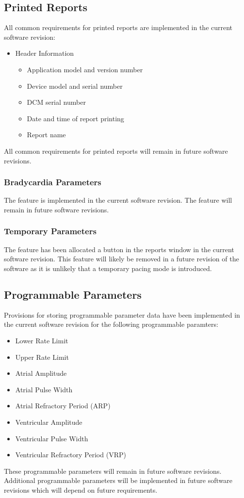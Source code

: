 \documentclass[12pt]{article}
\begin{document}
\subsection{Printed Reports}
All common requirements for printed reports are implemented in the current software revision:
\begin{itemize}
    \item Header Information
    \begin{itemize}
        \item Application model and version number
        \item Device model and serial number
        \item DCM serial number
        \item Date and time of report printing
        \item Report name
    \end{itemize}
\end{itemize}
All common requirements for printed reports will remain in future software revisions.
\subsubsection{Bradycardia Parameters}
The feature is implemented in the current software revision. The feature will remain in future software revisions.
\subsubsection{Temporary Parameters}
The feature has been allocated a button in the reports window in the current software revision. This feature will likely be removed in a future revision of the software as it is unlikely that a temporary pacing mode is introduced.

\subsection{Programmable Parameters}
Provisions for storing programmable parameter data have been implemented in the current software revision for the following programmable paramters:
\begin{itemize}
    \item Lower Rate Limit
    \item Upper Rate Limit
    \item Atrial Amplitude
    \item Atrial Pulse Width
    \item Atrial Refractory Period (ARP)
    \item Ventricular Amplitude
    \item Ventricular Pulse Width
    \item Ventricular Refractory Period (VRP)
\end{itemize}
These programmable parameters will remain in future software revisions. Additional programmable parameters will be implemented in future software revisions which will depend on future requirements.
\end{document}
